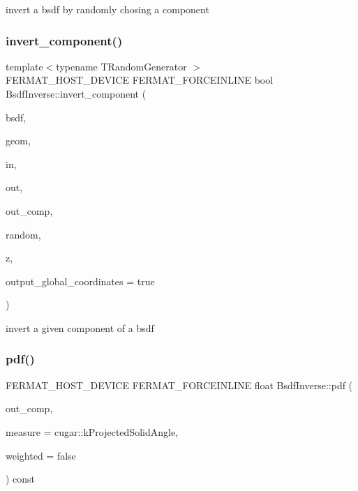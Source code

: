 invert a bsdf by randomly chosing a component \mbox{\label{group___path_module_gae150d5775f0c5c69fc21b8ab50680db6}} 
\subsubsection{\texorpdfstring{invert\+\_\+component()}{invert\_component()}}
{\footnotesize\ttfamily template$<$typename T\+Random\+Generator $>$ \\
F\+E\+R\+M\+A\+T\+\_\+\+H\+O\+S\+T\+\_\+\+D\+E\+V\+I\+CE F\+E\+R\+M\+A\+T\+\_\+\+F\+O\+R\+C\+E\+I\+N\+L\+I\+NE bool Bsdf\+Inverse\+::invert\+\_\+component (\begin{DoxyParamCaption}\item[{const \hyperlink{struct_bsdf}{Bsdf} \&}]{bsdf,  }\item[{const \hyperlink{struct_vertex_geometry}{Vertex\+Geometry} \&}]{geom,  }\item[{const \hyperlink{structcugar_1_1_vector}{cugar\+::\+Vector3f} \&}]{in,  }\item[{const \hyperlink{structcugar_1_1_vector}{cugar\+::\+Vector3f} \&}]{out,  }\item[{const \hyperlink{struct_bsdf_a5f7db6f81220ed9ee6da109d6eb5b585}{Bsdf\+::\+Component\+Type}}]{out\+\_\+comp,  }\item[{T\+Random\+Generator \&}]{random,  }\item[{\hyperlink{structcugar_1_1_vector}{cugar\+::\+Vector3f} \&}]{z,  }\item[{const bool}]{output\+\_\+global\+\_\+coordinates = {\ttfamily true} }\end{DoxyParamCaption})}

invert a given component of a bsdf \mbox{\label{group___path_module_gae689ddf830059ea1ebe7a235c954b25f}} 
\subsubsection{\texorpdfstring{pdf()}{pdf()}}
{\footnotesize\ttfamily F\+E\+R\+M\+A\+T\+\_\+\+H\+O\+S\+T\+\_\+\+D\+E\+V\+I\+CE F\+E\+R\+M\+A\+T\+\_\+\+F\+O\+R\+C\+E\+I\+N\+L\+I\+NE float Bsdf\+Inverse\+::pdf (\begin{DoxyParamCaption}\item[{const \hyperlink{struct_bsdf_a5f7db6f81220ed9ee6da109d6eb5b585}{Bsdf\+::\+Component\+Type}}]{out\+\_\+comp,  }\item[{cugar\+::\+Spherical\+Measure}]{measure = {\ttfamily cugar\+:\+:kProjectedSolidAngle},  }\item[{const bool}]{weighted = {\ttfamily false} }\end{DoxyParamCaption}) const}

